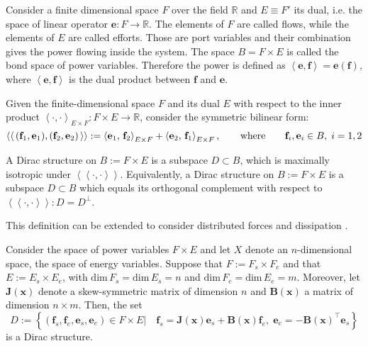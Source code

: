 Consider a  finite dimensional space ${F}$ over the field $\mathbb{R}$ and ${E} \equiv {F}'$ its dual, i.e. the space of linear operator $\mathbf{e} : {F} \rightarrow \mathbb{R}$. The elements of $\mathit{F}$ are called flows, while the elements of ${E}$ are called efforts. Those are port variables and their combination gives the power flowing inside the system. The space ${B} = {F} \times {E}$ is called the bond space of power variables. Therefore the power is defined as  $\left\langle \mathbf{e}, \mathbf{f} \right\rangle = \bm{e}(\mathbf{f})$, where $\left\langle \mathbf{e} , \mathbf{f} \right\rangle$ is the dual product between $\mathbf{f}$ and $\mathbf{e}$.
\begin{definition}
	Given the finite-dimensional space ${F}$ and its dual ${E}$ with respect to the inner product $\left\langle \cdot , \cdot \right\rangle_{E \times F} : {F} \times {E} \rightarrow \mathbb{R}$, consider the symmetric bilinear form:
	\begin{equation}
	\bilprod{(\mathbf{f}_1, \mathbf{e}_1)}{(\mathbf{f}_2, \mathbf{e}_2)} := \inner[E \times F]{\mathbf{e}_1}{\mathbf{f}_2} +  \inner[E \times F]{\mathbf{e}_2}{\mathbf{f}_1}, \where \mathbf{f}_i, \mathbf{e}_i \in {B}, \; i = 1, 2
	\end{equation}
	
	A Dirac structure on ${B} := {F} \times {E}$ is a subspace ${D} \subset {B}$, which is maximally isotropic under $\left\langle \left\langle \cdot, \cdot \right\rangle \right\rangle$.	Equivalently, a Dirac structure on ${B} := {F} \times {E}$ is a subspace ${D} \subset {B}$ 	which equals its orthogonal complement with respect to $\left\langle \left\langle \cdot, \cdot \right\rangle \right\rangle: {D} ={D}^\perp$.
\end{definition}
This definition can be extended to consider distributed forces and dissipation \cite{villegas2007}.
\begin{proposition}
	\label{prop:Dirac}
	Consider the space of power variables ${F} \times {E}$ and let ${X}$ denote an $n$-dimensional space, the space of energy variables. Suppose that ${F} := {F}_s \times {F}_e $ and that ${E} := {E}_s  \times {E}_e $, with $\text{dim} \, {F}_s = \text{dim} \, {E}_s = n$ and $\text{dim} \, {F}_e = \text{dim} \, {E}_e = m$. Moreover, let $\mathbf{J}(\mathbf{x})$ denote
	a skew-symmetric matrix of dimension $n$ and $\mathbf{B}(\mathbf{x})$ a matrix of dimension $n \times m$. Then, the set
	\begin{equation}
	{D} := \left\{ (\mathbf{f}_s, \mathbf{f}_e , \mathbf{e}_s ,\mathbf{e}_e ) \in {F} \times {E} \vert \quad \mathbf{f}_s = \mathbf{J}(\mathbf{x}) \mathbf{e}_s + \mathbf{B}(\mathbf{x}) \mathbf{f}_e, \; \mathbf{e}_e = -\mathbf{B}(\mathbf{x})^\top \mathbf{e}_s \right\}
	\end{equation}
	is a Dirac structure.
\end{proposition}

